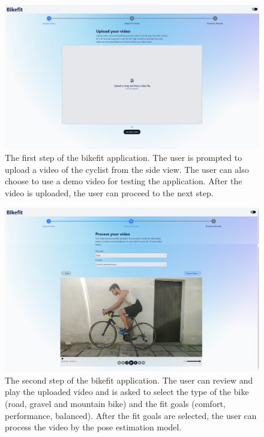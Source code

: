 \begin{figure}[htbp]
    \centering
    \includegraphics[width=\textwidth]{obrazky-figures/step1.png}
    \caption{The first step of the bikefit application. The user is prompted to upload a video of the cyclist from the side view. The user can also choose to use a demo video for testing the application. After the video is uploaded, the user can proceed to the next step.}
    \label{fig:step1}
\end{figure}

\begin{figure}[htbp]
    \centering
    \includegraphics[width=\textwidth]{obrazky-figures/step2.png}
    \caption{The second step of the bikefit application. The user can review and play the uploaded video and is asked to select the type of the bike (road, gravel and mountain bike) and the fit goals (comfort, performance, balanced). After the fit goals are selected, the user can process the video by the pose estimation model.}
    \label{fig:step2}
\end{figure}

